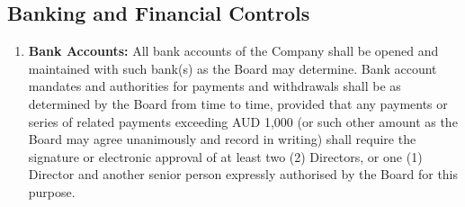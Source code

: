 \subsection{Banking and Financial Controls}
\begin{enumerate}[label=(\alph*)]
\item \textbf{Bank Accounts:} All bank accounts of the Company shall be opened and maintained with such bank(s) as the Board may determine. Bank account mandates and authorities for payments and withdrawals shall be as determined by the Board from time to time, provided that any payments or series of related payments exceeding AUD 1,000 (or such other amount as the Board may agree unanimously and record in writing) shall require the signature or electronic approval of at least two (2) Directors, or one (1) Director and another senior person expressly authorised by the Board for this purpose.


\end{enumerate}
